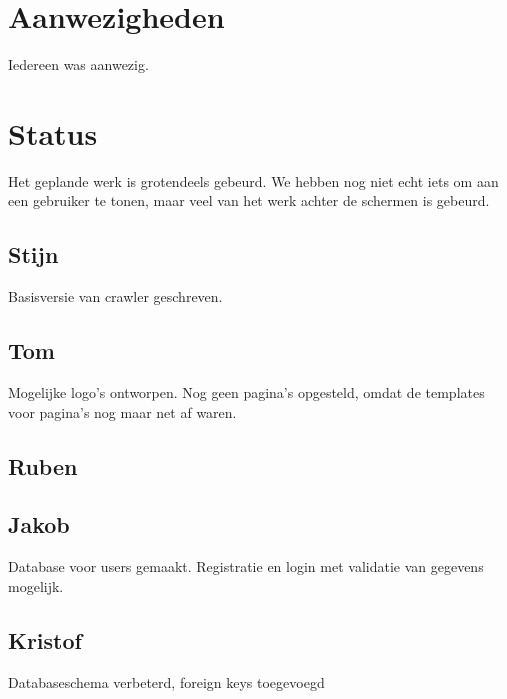 \documentclass[11pt, a4paper]{article}
\begin{document}
\title{}
\author{Groep A\\ Week 3}
\date{27 februari 2014}
\maketitle

\section{Aanwezigheden}
Iedereen was aanwezig.
\section{Status}
Het geplande werk is grotendeels gebeurd. We hebben nog niet echt iets om aan een gebruiker te tonen, maar veel van het werk achter de schermen is gebeurd.
\subsection{Stijn}
Basisversie van crawler geschreven.
\subsection{Tom}
Mogelijke logo's ontworpen. Nog geen pagina's opgesteld, omdat de templates voor pagina's nog maar net af waren.
\subsection{Ruben}
\subsection{Jakob}
Database voor users gemaakt. Registratie en login met validatie van gegevens mogelijk.
\subsection{Kristof}
Databaseschema verbeterd, foreign keys toegevoegd
\end{document}
